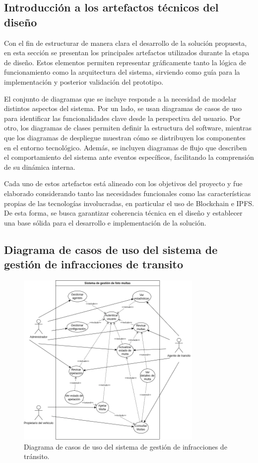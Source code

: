 \subsection{Introducción a los artefactos técnicos del diseño}
Con el fin de estructurar de manera clara el desarrollo de la solución propuesta, en esta sección se presentan los principales artefactos utilizados durante la etapa de diseño. Estos elementos permiten representar gráficamente tanto la lógica de funcionamiento como la arquitectura del sistema, sirviendo como guía para la implementación y posterior validación del prototipo.

El conjunto de diagramas que se incluye responde a la necesidad de modelar distintos aspectos del sistema. Por un lado, se usan diagramas de casos de uso para identificar las funcionalidades clave desde la perspectiva del usuario. Por otro, los diagramas de clases permiten definir la estructura del software, mientras que los diagramas de despliegue muestran cómo se distribuyen los componentes en el entorno tecnológico. Además, se incluyen diagramas de flujo que describen el comportamiento del sistema ante eventos específicos, facilitando la comprensión de su dinámica interna.

Cada uno de estos artefactos está alineado con los objetivos del proyecto y fue elaborado considerando tanto las necesidades funcionales como las características propias de las tecnologías involucradas, en particular el uso de Blockchain e IPFS. De esta forma, se busca garantizar coherencia técnica en el diseño y establecer una base sólida para el desarrollo e implementación de la solución.

\subsection{Diagrama de casos de uso del sistema de gestión de infracciones de transito }
\begin{figure}[htbp]
    \centering
    \includegraphics[width=0.8\textwidth]{Images/CasosUso.png}
    \caption{Diagrama de casos de uso del sistema de gestión de infracciones de tránsito.}
    \label{fig:casos_uso}
\end{figure}

